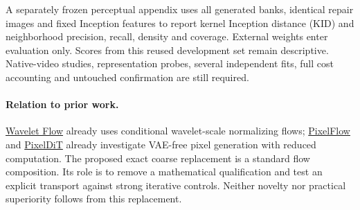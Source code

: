 \documentclass[11pt]{article}
\begin{document}
A separately frozen perceptual appendix uses all generated banks, identical repair images and fixed Inception features to report kernel Inception distance (KID) and neighborhood precision, recall, density and coverage. External weights enter evaluation only. Scores from this reused development set remain descriptive. Native-video studies, representation probes, several independent fits, full cost accounting and untouched confirmation are still required.

\paragraph{Relation to prior work.}
\href{https://arxiv.org/abs/2010.13821}{Wavelet Flow} already uses conditional wavelet-scale normalizing flows; \href{https://arxiv.org/abs/2504.07963}{PixelFlow} and \href{https://arxiv.org/abs/2511.20645}{PixelDiT} already investigate VAE-free pixel generation with reduced computation. The proposed exact coarse replacement is a standard flow composition. Its role is to remove a mathematical qualification and test an explicit transport against strong iterative controls. Neither novelty nor practical superiority follows from this replacement.
\end{document}
